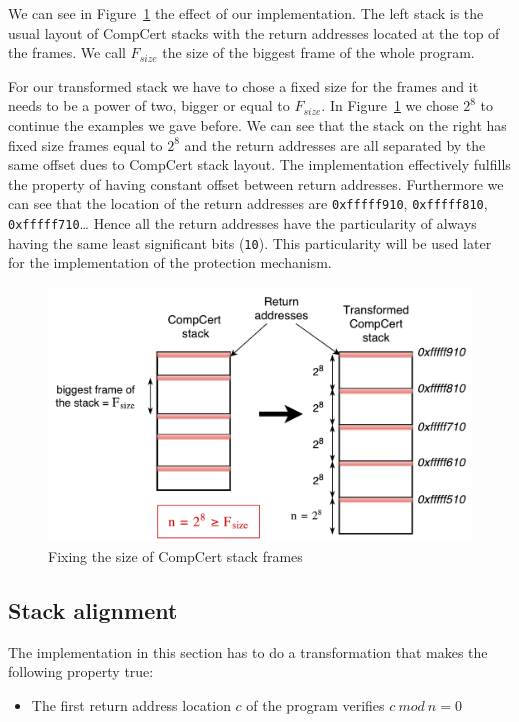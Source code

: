 \documentclass[11pt]{sdm}
\begin{document}
We can see in Figure~\ref{stack_transform} the effect of our implementation. 
The left stack is the usual layout of CompCert stacks with the return addresses located at the top of the frames. We call $F_{size}$ the size of the biggest frame of the whole program.

For our transformed stack we have to chose a fixed size for the frames and it needs to be a power of two, bigger or equal to $F_{size}$. In Figure~\ref{stack_transform} we chose $2^8$ to continue the examples we gave before.
We can see that the stack on the right has fixed size frames equal to $2^8$ and the return addresses are all separated by the same offset dues to CompCert stack layout.
The implementation effectively fulfills the property of having constant offset between return addresses.
Furthermore we can see that the location of the return addresses are \texttt{0xfffff910}, \texttt{0xfffff810}, \texttt{0xfffff710}\dots
Hence all the return addresses have the particularity of always having the same least significant bits (\texttt{10}). This particularity will be used later for the implementation of the protection mechanism.

\begin{figure}[!ht]
\centering
\includegraphics[scale=0.6]{images/stack_transform.pdf}
\caption{Fixing the size of CompCert stack frames}
\label{stack_transform}
\end{figure}

\subsection{Stack alignment}

The implementation in this section has to do a transformation that makes the following property true:
\begin{itemize}
	\item The first return address location $c$ of the program verifies $c~mod~n=0$
\end{itemize}
\end{document}
